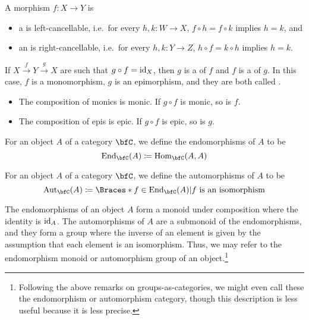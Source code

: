 \documentclass[a5paper]{article}
\newcommand{\dual}[2]{
  \begin{itemize}\renewcommand{\labelitemi}{$\circ $}
    \itemsep0em
    \item #1
    \item #2
   \end{itemize}
}
\begin{document}
\begin{definition}
  A morphism $f:X\to Y$ is 
  \begin{itemize}
    \item a  is left-cancellable, i.e.\ for every 
      $h,k:W\to X$, $f\circ h=f\circ k$ implies $h=k$, and
    \item an  is right-cancellable, i.e.\ for every 
      $h,k:Y\to Z$, $h\circ f=k\circ h$ implies $h=k$.
  \end{itemize}
  If $X\xrightarrow{f}Y\xrightarrow{g}X$ are such that $g\circ f =\operatorname{id}_X$, then
  $g$ is a  of $f$ and $f$ is a  of $g$.
  In this case, $f$ is a monomorphism, $g$ is an epimorphism, and they are both
  called .
\end{definition}

\begin{lemma}
  \dual{
    The composition of monics is monic. If $g\circ f$ is monic, so is $f$.
  }{
    The composition of epis is epic. If $g\circ f$ is epic, so is $g$.
  }
\end{lemma}

\begin{definition*}
	For an object $A$ of a category $\bfC$, we define the endomorphisms of $A$ to
  be
  \begin{equation*}
    \End_{\bfC}(A) \coloneqq \Hom_{\bfC}(A,A)
  \end{equation*}
\end{definition*}

\begin{definition*}
	For an object $A$ of a category $\bfC$, we define the automorphisms of $A$ to
  be
  \begin{equation*}
    \Aut_{\bfC}(A) \coloneqq \braces{f\in \End_{\bfC}(A)|f\text{ is an isomorphism}}
  \end{equation*}
\end{definition*}

\begin{remark*}
  The endomorphisms of an object $A$ form a monoid under composition where the
  identity is $\operatorname{id}_A$. The automorphisms of $A$ are a submonoid of the
  endomorphisms, and they form a group where the inverse of an element is given
  by the assumption that each element is an isomorphism.
  Thus, we may refer to the endomorphism monoid or automorphism group of an
  object.\footnote{Following the above remarks on groups-as-categories, we might
    even call these the endomorphism or automorphism category, though this
    description is less useful because it is less precise.}
\end{remark*}
\end{document}
